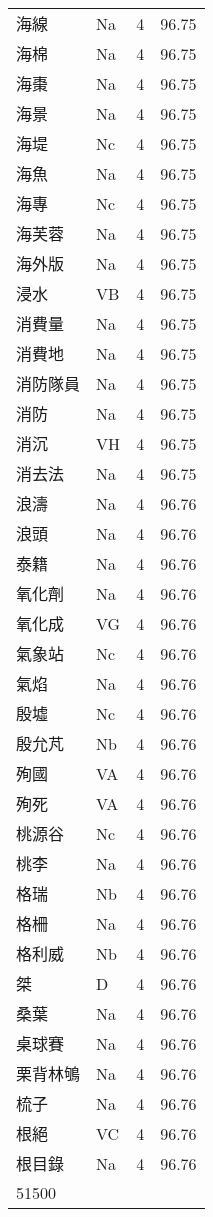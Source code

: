 \documentclass[twocolumn]{book}
\begin{document}
\begin{supertabular}{llrr}
海線 & Na & 4 &  96.75\\
海棉 & Na & 4 &  96.75\\
海棗 & Na & 4 &  96.75\\
海景 & Na & 4 &  96.75\\
海堤 & Nc & 4 &  96.75\\
海魚 & Na & 4 &  96.75\\
海專 & Nc & 4 &  96.75\\
海芙蓉 & Na & 4 &  96.75\\
海外版 & Na & 4 &  96.75\\
浸水 & VB & 4 &  96.75\\
消費量 & Na & 4 &  96.75\\
消費地 & Na & 4 &  96.75\\
消防隊員 & Na & 4 &  96.75\\
消防 & Na & 4 &  96.75\\
消沉 & VH & 4 &  96.75\\
消去法 & Na & 4 &  96.75\\
浪濤 & Na & 4 &  96.76\\
浪頭 & Na & 4 &  96.76\\
泰籍 & Na & 4 &  96.76\\
氧化劑 & Na & 4 &  96.76\\
氧化成 & VG & 4 &  96.76\\
氣象站 & Nc & 4 &  96.76\\
氣焰 & Na & 4 &  96.76\\
殷墟 & Nc & 4 &  96.76\\
殷允芃 & Nb & 4 &  96.76\\
殉國 & VA & 4 &  96.76\\
殉死 & VA & 4 &  96.76\\
桃源谷 & Nc & 4 &  96.76\\
桃李 & Na & 4 &  96.76\\
格瑞 & Nb & 4 &  96.76\\
格柵 & Na & 4 &  96.76\\
格利威 & Nb & 4 &  96.76\\
桀 & D & 4 &  96.76\\
桑葉 & Na & 4 &  96.76\\
桌球賽 & Na & 4 &  96.76\\
栗背林鴝 & Na & 4 &  96.76\\
梳子 & Na & 4 &  96.76\\
根絕 & VC & 4 &  96.76\\
根目錄 & Na & 4 &  96.76\\
51500\\

\end{supertabular}
\end{document}
